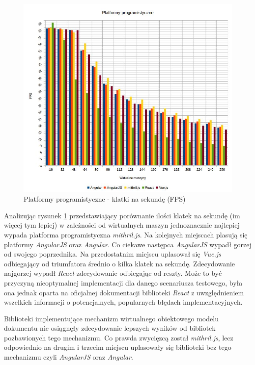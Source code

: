 \documentclass[polish, twoside, 12pt]{mwart}
\begin{document}
\begin{figure}[ht]
  \includegraphics[width=\textwidth]{frameworks-fps.jpg}
  \caption{Platformy programistyczne - klatki na sekundę (FPS)}
  \label{fig:frameworks-fps}
\end{figure}

Analizując rysunek \ref{fig:frameworks-fps} przedstawiający porównanie ilości klatek na sekundę (im więcej tym lepiej) w zależności od wirtualnych maszyn jednoznacznie najlepiej wypada platforma programistyczna \emph{mithril.js}. Na kolejnych miejscach plasują się platformy \emph{AngularJS} oraz \emph{Angular}. Co ciekawe następca \emph{AngularJS} wypadł gorzej od swojego poprzednika. Na przedostatnim miejscu uplasował się \emph{Vue.js} odbiegający od triumfatora średnio o kilka klatek na sekundę. Zdecydowanie najgorzej wypadł \emph{React} zdecydowanie odbiegając od reszty. Może to być przyczyną nieoptymalnej implementacji dla danego scenariusza testowego, była ona jednak oparta na oficjalnej dokumentacji biblioteki \emph{React} z uwzględnieniem wszelkich informacji o potencjalnych, popularnych błędach implementacyjnych. 

Biblioteki implementujące mechanizm wirtualnego obiektowego modelu dokumentu nie osiągnęły zdecydowanie lepszych wyników od bibliotek pozbawionych tego mechanizmu. Co prawda zwycięzcą został \emph{mithril.js}, lecz odpowiednio na drugim i trzecim miejscu uplasowały się biblioteki bez tego mechanizmu czyli \emph{AngularJS} oraz \emph{Angular}.
\end{document}
